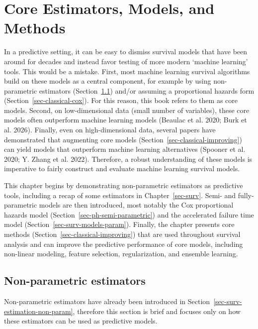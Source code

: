 \documentclass[
  letterpaper,
  krantz2]{style/krantz}
\begin{document}
\chapter{Core Estimators, Models, and Methods}\label{sec-classical}

In a predictive setting, it can be easy to dismiss survival models that
have been around for decades and instead favor testing of more modern
`machine learning' tools. This would be a mistake. First, most machine
learning survival algorithms build on these models as a central
component, for example by using non-parametric estimators
(Section~\ref{sec-classical-nonpar}) and/or assuming a proportional
hazards form (Section~\ref{sec-classical-cox}). For this reason, this
book refers to them as core models. Second, on low-dimensional data
(small number of variables), these core models often outperform machine
learning models (Beaulac et al. 2020; Burk et al. 2026). Finally, even
on high-dimensional data, several papers
have demonstrated that augmenting core models
(Section~\ref{sec-classical-improving}) can yield models that outperform
machine learning alternatives (Spooner et al. 2020; Y. Zhang et al.
2022). Therefore, a robust understanding of these models is imperative
to fairly construct and evaluate machine learning survival models.

This chapter begins by demonstrating non-parametric estimators as
predictive tools, including a recap of some estimators in
Chapter~\ref{sec-surv}. Semi- and fully-parametric models are then
introduced, most notably the Cox proportional hazards model
(Section~\ref{sec-ph-semi-parametric}) and the accelerated failure time
model (Section~\ref{sec-surv-models-param}). Finally, the chapter
presents core methods (Section~\ref{sec-classical-improving}) that are
used throughout survival analysis and can improve the predictive
performance of core models, including non-linear modeling, feature
selection, regularization, and ensemble learning.

\section{Non-parametric estimators}\label{sec-classical-nonpar}

Non-parametric estimators have already
been introduced in Section~\ref{sec-surv-estimation-non-param},
therefore this section is brief and focuses only on how these estimators
can be used as predictive models.
\end{document}
